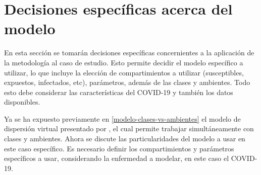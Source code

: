\section{Decisiones específicas acerca del modelo} \label{met:decisiones}













En esta sección se tomarán decisiones específicas concernientes a la aplicación de la metodología al caso de estudio. Esto permite decidir el modelo específico a utilizar, lo que incluye la elección de compartimientos a utilizar (susceptibles, expuestos, infectados, etc), parámetros, además de las clases y ambientes. Todo esto debe considerar las características del COVID-19 y también los datos disponibles. 

Ya se ha expuesto previamente en \ref{modelo-clases-vs-ambientes} el modelo de dispersión virtual presentado por \cite{Bichara2015}, el cual permite trabajar simultáneamente con clases y ambientes. Ahora se discute las particularidades del modelo a usar en este caso específico. Es necesario definir los compartimientos y parámetros específicos a usar, considerando la enfermedad a modelar, en este caso el COVID-19.

